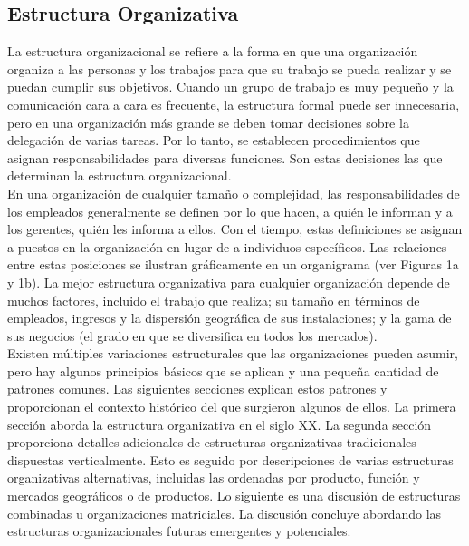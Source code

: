 \documentclass[10pt]{book}
\begin{document}
\subsection{Estructura Organizativa}
La estructura organizacional se refiere a la forma en que una organización organiza a las personas y los trabajos para que su trabajo se pueda realizar y se puedan cumplir sus objetivos. Cuando un grupo de trabajo es muy pequeño y la comunicación cara a cara es frecuente, la estructura formal puede ser innecesaria, pero en una organización más grande se deben tomar decisiones sobre la delegación de varias tareas. Por lo tanto, se establecen procedimientos que asignan responsabilidades para diversas funciones. Son estas decisiones las que determinan la estructura organizacional.\\
En una organización de cualquier tamaño o complejidad, las responsabilidades de los empleados generalmente se definen por lo que hacen, a quién le informan y a los gerentes, quién les informa a ellos. Con el tiempo, estas definiciones se asignan a puestos en la organización en lugar de a individuos específicos. Las relaciones entre estas posiciones se ilustran gráficamente en un organigrama (ver Figuras 1a y 1b). La mejor estructura organizativa para cualquier organización depende de muchos factores, incluido el trabajo que realiza; su tamaño en términos de empleados, ingresos y la dispersión geográfica de sus instalaciones; y la gama de sus negocios (el grado en que se diversifica en todos los mercados).\\
Existen múltiples variaciones estructurales que las organizaciones pueden asumir, pero hay algunos principios básicos que se aplican y una pequeña cantidad de patrones comunes. Las siguientes secciones explican estos patrones y proporcionan el contexto histórico del que surgieron algunos de ellos. La primera sección aborda la estructura organizativa en el siglo XX. La segunda sección proporciona detalles adicionales de estructuras organizativas tradicionales dispuestas verticalmente. Esto es seguido por descripciones de varias estructuras organizativas alternativas, incluidas las ordenadas por producto, función y mercados geográficos o de productos. Lo siguiente es una discusión de estructuras combinadas u organizaciones matriciales. La discusión concluye abordando las estructuras organizacionales futuras emergentes y potenciales.
\end{document}
